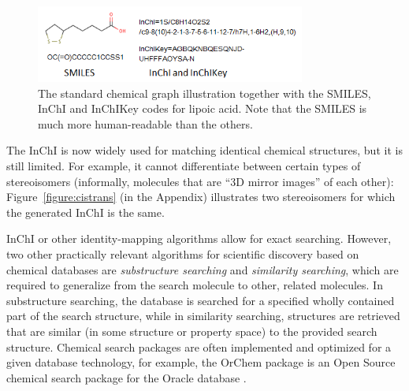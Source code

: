 \documentclass{sig-alternate}
\begin{document}
\begin{figure}
\centering
\includegraphics[height=1in]{lipoicacid.png}
\caption{The standard chemical graph illustration together with the
  SMILES, InChI and InChIKey codes for lipoic acid. Note that the
  SMILES is much more human-readable than the others.}
\label{figure:smiles}
\end{figure}

The InChI is now widely used for matching identical chemical
structures, but it is still limited. For example, it cannot
differentiate between certain types of stereoisomers (informally,
molecules that are ``3D mirror images'' of each other):
Figure~\ref{figure:cistrans} (in the Appendix) illustrates two
stereoisomers for which the generated InChI is the same.

InChI or other identity-mapping algorithms allow for exact
searching. However, two other practically relevant algorithms for
scientific discovery based on chemical databases are
\emph{substructure searching} and \emph{similarity searching}, which
are required to generalize from the search molecule
to other, related molecules. In substructure
searching, the database is searched for a specified wholly contained
part of the search structure, while in similarity searching,
structures are retrieved that are similar (in some structure or
property space) to the provided search structure. Chemical
search packages are often implemented and optimized for a given
database technology, for example, the OrChem package is an Open Source
chemical search package for the Oracle database \cite{rijnbeek2009}.
\end{document}
